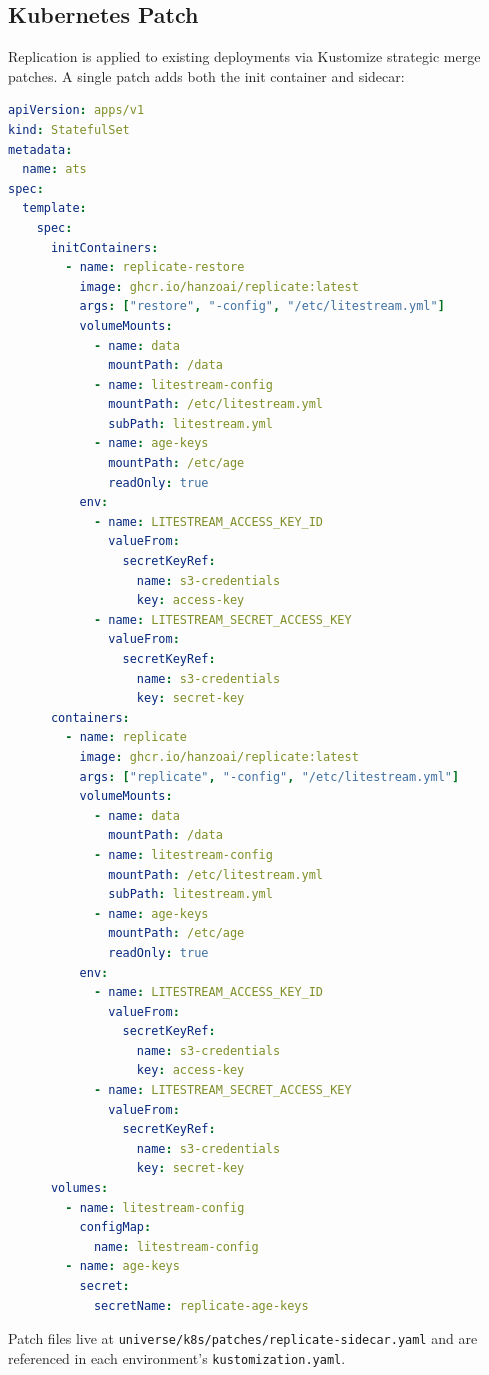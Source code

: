 \documentclass[11pt,a4paper]{article}
\begin{document}
\subsection{Kubernetes Patch}\label{sec:k8s-patch}

Replication is applied to existing deployments via Kustomize strategic
merge patches. A single patch adds both the init container and sidecar:

\begin{lstlisting}[language=YAML,caption={Kustomize patch: replicate-sidecar.yaml}]
apiVersion: apps/v1
kind: StatefulSet
metadata:
  name: ats
spec:
  template:
    spec:
      initContainers:
        - name: replicate-restore
          image: ghcr.io/hanzoai/replicate:latest
          args: ["restore", "-config", "/etc/litestream.yml"]
          volumeMounts:
            - name: data
              mountPath: /data
            - name: litestream-config
              mountPath: /etc/litestream.yml
              subPath: litestream.yml
            - name: age-keys
              mountPath: /etc/age
              readOnly: true
          env:
            - name: LITESTREAM_ACCESS_KEY_ID
              valueFrom:
                secretKeyRef:
                  name: s3-credentials
                  key: access-key
            - name: LITESTREAM_SECRET_ACCESS_KEY
              valueFrom:
                secretKeyRef:
                  name: s3-credentials
                  key: secret-key
      containers:
        - name: replicate
          image: ghcr.io/hanzoai/replicate:latest
          args: ["replicate", "-config", "/etc/litestream.yml"]
          volumeMounts:
            - name: data
              mountPath: /data
            - name: litestream-config
              mountPath: /etc/litestream.yml
              subPath: litestream.yml
            - name: age-keys
              mountPath: /etc/age
              readOnly: true
          env:
            - name: LITESTREAM_ACCESS_KEY_ID
              valueFrom:
                secretKeyRef:
                  name: s3-credentials
                  key: access-key
            - name: LITESTREAM_SECRET_ACCESS_KEY
              valueFrom:
                secretKeyRef:
                  name: s3-credentials
                  key: secret-key
      volumes:
        - name: litestream-config
          configMap:
            name: litestream-config
        - name: age-keys
          secret:
            secretName: replicate-age-keys
\end{lstlisting}

Patch files live at \texttt{universe/k8s/patches/replicate-sidecar.yaml}
and are referenced in each environment's \texttt{kustomization.yaml}.
\end{document}
